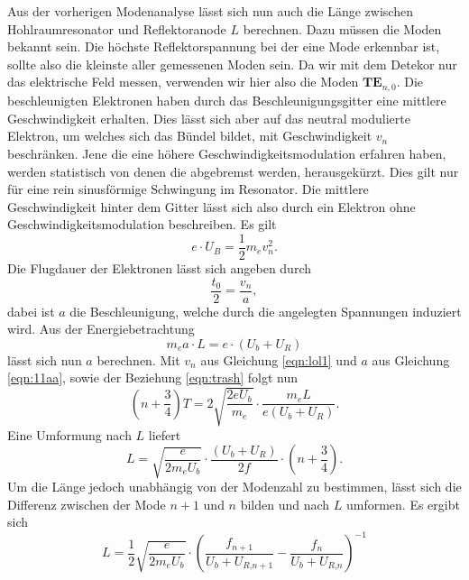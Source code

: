 \newline
Aus der vorherigen Modenanalyse lässt sich nun auch die Länge zwischen Hohlraumresonator und Reflektoranode $L$ berechnen. Dazu müssen die Moden bekannt sein. Die höchste Reflektorspannung bei der eine Mode erkennbar ist, 
sollte also die kleinste aller gemessenen Moden sein. Da wir mit dem Detekor nur das elektrische Feld messen, verwenden wir hier also die Moden $\textbf{TE}_{n,0}$.
Die beschleunigten Elektronen haben durch das Beschleunigungsgitter eine mittlere Geschwindigkeit erhalten. Dies lässt sich aber auf das neutral modulierte Elektron, um welches sich das Bündel bildet, mit 
Geschwindigkeit $v_n$ beschränken. Jene die eine höhere Geschwindigkeitsmodulation erfahren haben, werden statistisch von denen 
die abgebremst werden, herausgekürzt. Dies gilt nur für eine rein sinusförmige Schwingung im Resonator. Die mittlere Geschwindigkeit hinter dem Gitter lässt sich also durch ein Elektron ohne Geschwindigkeitsmodulation 
beschreiben. Es gilt
\begin{equation}
    \label{eqn:lol1}
e \cdot U_{B} = \frac{1}{2}m_e v_{n}^2.
\end{equation}
Die Flugdauer der Elektronen lässt sich angeben durch
\begin{equation}
\frac{t_0}{2} = \frac{v_{n}}{a},
\end{equation}
dabei ist $a$ die Beschleunigung, welche durch die angelegten Spannungen induziert wird. Aus der Energiebetrachtung
\begin{equation}
    \label{eqn:11aa}
m_e a \cdot L = e \cdot (U_b + U_R)
\end{equation}
lässt sich nun $a$ berechnen. Mit $v_{n}$ aus Gleichung \ref{eqn:lol1} und $a$ aus Gleichung \ref{eqn:11aa}, sowie der Beziehung \ref{eqn:trash} folgt nun
\begin{equation*}
\left(n + \frac{3}{4}\right)T = 2 \sqrt{\frac{2eU_b}{m_e}} \cdot \frac{m_e L}{e (U_b + U_R)}.
\end{equation*}
Eine Umformung nach $L$ liefert 
\begin{equation}
    \label{eqn:wtfisthis}
L =  \sqrt{\frac{e}{2 m_e U_b}} \cdot \frac{(U_b + U_R)}{2f} \cdot \left(n + \frac{3}{4}\right).
\end{equation}
Um die Länge jedoch unabhängig von der Modenzahl zu bestimmen, lässt sich die Differenz zwischen der Mode $n+1$ und $n$ bilden und nach $L$ umformen. Es ergibt sich
\begin{equation}
    \label{eqn:kackL}
L = \frac{1}{2}\sqrt{\frac{e}{2m_eU_b}} \cdot \left( \frac{f_{n+1}}{U_b+U_{R\text{,}n+1}} - \frac{f_{n}}{U_b+U_{R\text{,}n}}\right)^{-1}
\end{equation}
